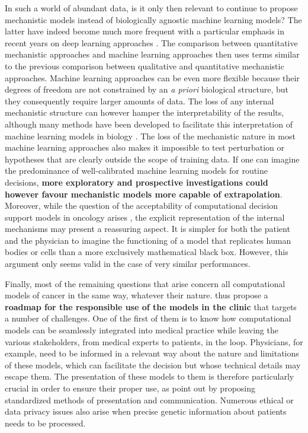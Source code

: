 \documentclass[a4paper,12pt,twoside,onecolumn,openright,final,oldfontcommands]{memoir}
\begin{document}
In such a world of abundant data, is it only then relevant to continue
to propose mechanistic models instead of biologically agnostic machine
learning models? The latter have indeed become much more frequent with a
particular emphasis in recent years on deep learning approaches
\citep{angermueller2016deep, eraslan2019deep}. The comparison between
quantitative mechanistic approaches and machine learning approaches then
uses terms similar to the previous comparison between qualitative and
quantitative mechanistic approaches. Machine learning approaches can be
even more flexible because their degrees of freedom are not constrained
by an \emph{a priori} biological structure, but they consequently
require larger amounts of data. The loss of any internal mechanistic
structure can however hamper the interpretability of the results,
although many methods have been developed to facilitate this
interpretation of machine learning models in biology
\citep{azuaje2019artificial, manica2019toward}. The loss of the
mechanistic nature in most machine learning approaches also makes it
impossible to test perturbation or hypotheses that are clearly outside
the scope of training data. If one can imagine the predominance of
well-calibrated machine learning models for routine decisions,
\textbf{more exploratory and prospective investigations could however
favour mechanistic models more capable of extrapolation}. Moreover,
while the question of the acceptability of computational decision
support models in oncology arises \citep{vollmer2020machine}, the
explicit representation of the internal mechanisms may present a
reassuring aspect. It is simpler for both the patient and the physician
to imagine the functioning of a model that replicates human bodies or
cells than a more exclusively mathematical black box. However, this
argument only seems valid in the case of very similar performances.

Finally, most of the remaining questions that arise concern all
computational models of cancer in the same way, whatever their nature.
\citet{wiens2019no} thus propose a \textbf{roadmap for the responsible
use of the models in the clinic} that targets a number of challenges.
One of the first of them is to know how computational models can be
seamlessly integrated into medical practice while leaving the various
stakeholders, from medical experts to patients, in the loop. Physicians,
for example, need to be informed in a relevant way about the nature and
limitations of these models, which can facilitate the decision but whose
technical details may escape them. The presentation of these models to
them is therefore particularly crucial in order to ensure their proper
use, as \citet{sendak2020presenting} point out by proposing standardized
methods of presentation and communication. Numerous ethical or data
privacy issues also arise when precise genetic information about
patients needs to be processed.
\end{document}
